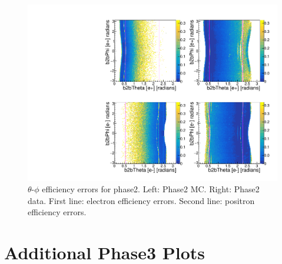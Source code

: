 \documentclass[a4paper,11pt,twosided,final,german,openbib,pdftex,listof=totoc,bibliography=totoc]{scrbook}
\begin{document}
\begin{appendix}
\begin{figure}[!htbp]
	\centering
	\includegraphics[width=\textwidth]{Plots/master/xCEffTP_MCData_Error.pdf}
	\caption[$\theta$-$\phi$ Efficiency Error Plots Phase2]{$\theta$-$\phi$ efficiency errors for phase2. Left: Phase2 MC. Right: Phase2 data. First line: electron efficiency errors. Second line: positron efficiency errors.}
	\label{plt:xCEff_Error}
\end{figure}















\chapter{Additional Phase3 Plots}
\label{A:3}










\end{appendix}
\end{document}
